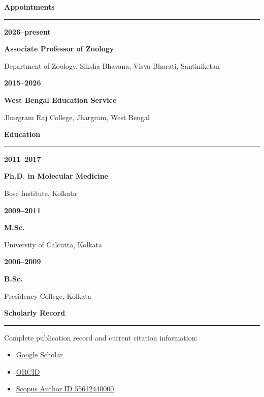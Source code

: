 \documentclass[10pt,a4paper]{article}
\newcommand{\cvlink}[2]{\href{#1}{#2}}
\newcommand{\cvdate}[1]{{\sffamily\bfseries\color{gerua}#1}}
\newcommand{\cvsection}[1]{%
  \par\vspace{5pt}%
  {\large\bfseries\sffamily\color{ink}#1}\par
  \vspace{-2pt}\textcolor{linegray}{\rule{\linewidth}{0.45pt}}\vspace{1.5pt}%
}
\newcommand{\compactentry}[3]{%
  \cvdate{#1}\par
  \textbf{#2}\par
  {\color{softgray}#3}\par\vspace{4pt}%
}
\begin{document}
\vspace{2pt}
\begin{minipage}[t]{0.36\textwidth}
\raggedright

\cvsection{Appointments}
\compactentry{2026--present}{Associate Professor of Zoology}{Department of Zoology, Siksha Bhavana, Visva-Bharati, Santiniketan}
\compactentry{2015--2026}{West Bengal Education Service}{Jhargram Raj College, Jhargram, West Bengal}

\cvsection{Education}
\compactentry{2011--2017}{Ph.D. in Molecular Medicine}{Bose Institute, Kolkata}
\compactentry{2009--2011}{M.Sc.}{University of Calcutta, Kolkata}
\compactentry{2006--2009}{B.Sc.}{Presidency College, Kolkata}

\cvsection{Scholarly Record}
Complete publication record and current citation information:
\begin{itemize}
  \item \cvlink{https://scholar.google.com/citations?user=ZEI-IzMAAAAJ}{Google Scholar}
  \item \cvlink{https://orcid.org/0000-0001-9590-3875}{ORCID}
  \item \cvlink{http://www.scopus.com/inward/authorDetails.url?authorID=55612440000\&partnerID=MN8TOARS}{Scopus Author ID 55612440000}
\end{itemize}

\end{minipage}
\hfill
\end{document}
